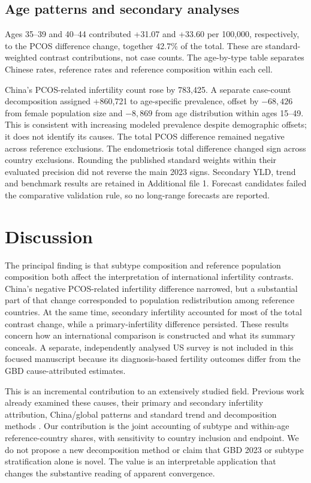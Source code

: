 \documentclass[11pt,a4paper]{article}
\begin{document}

\subsection{Age patterns and secondary analyses}
Ages 35--39 and 40--44 contributed +31.07 and +33.60 per 100,000, respectively, to the PCOS difference change, together 42.7\% of the total. These are standard-weighted contrast contributions, not case counts. The age-by-type table separates Chinese rates, reference rates and reference composition within each cell.

China's PCOS-related infertility count rose by 783,425. A separate case-count decomposition assigned +860,721 to age-specific prevalence, offset by $-68,426$ from female population size and $-8,869$ from age distribution within ages 15--49. This is consistent with increasing modeled prevalence despite demographic offsets; it does not identify its causes. The total PCOS difference remained negative across reference exclusions. The endometriosis total difference changed sign across country exclusions. Rounding the published standard weights within their evaluated precision did not reverse the main 2023 signs. Secondary YLD, trend and benchmark results are retained in Additional file 1. Forecast candidates failed the comparative validation rule, so no long-range forecasts are reported.

\section{Discussion}
The principal finding is that subtype composition and reference population composition both affect the interpretation of international infertility contrasts. China's negative PCOS-related infertility difference narrowed, but a substantial part of that change corresponded to population redistribution among reference countries. At the same time, secondary infertility accounted for most of the total contrast change, while a primary-infertility difference persisted. These results concern how an international comparison is constructed and what its summary conceals. A separate, independently analysed US survey is not included in this focused manuscript because its diagnosis-based fertility outcomes differ from the GBD cause-attributed estimates.

This is an incremental contribution to an extensively studied field. Previous work already examined these causes, their primary and secondary infertility attribution, China/global patterns and standard trend and decomposition methods \cite{xu,lu,wang,feng}. Our contribution is the joint accounting of subtype and within-age reference-country shares, with sensitivity to country inclusion and endpoint. We do not propose a new decomposition method or claim that GBD 2023 or subtype stratification alone is novel. The value is an interpretable application that changes the substantive reading of apparent convergence.
\end{document}
